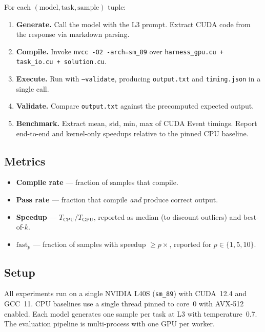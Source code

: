 \documentclass{article}
\begin{document}
For each \((\text{model}, \text{task}, \text{sample})\) tuple:
\begin{enumerate}
  \item \textbf{Generate.} Call the model with the L3 prompt. Extract
        CUDA code from the response via markdown parsing.
  \item \textbf{Compile.} Invoke \texttt{nvcc -O2 -arch=sm\_89} over
        \texttt{harness\_gpu.cu + task\_io.cu + solution.cu}.
  \item \textbf{Execute.} Run with \texttt{--validate}, producing
        \texttt{output.txt} and \texttt{timing.json} in a single call.
  \item \textbf{Validate.} Compare \texttt{output.txt} against the
        precomputed expected output.
  \item \textbf{Benchmark.} Extract mean, std, min, max of CUDA Event
        timings. Report end-to-end and kernel-only speedups relative
        to the pinned CPU baseline.
\end{enumerate}

\subsection{Metrics}

\begin{itemize}
  \item \textbf{Compile rate} --- fraction of samples that compile.
  \item \textbf{Pass rate} --- fraction that compile \emph{and}
        produce correct output.
  \item \textbf{Speedup} --- $T_{\text{CPU}} / T_{\text{GPU}}$,
        reported as median (to discount outliers) and best-of-$k$.
  \item \textbf{$\mathrm{fast}_p$} --- fraction of samples with
        speedup $\geq p\times$, reported for $p \in \{1, 5, 10\}$.
\end{itemize}

\subsection{Setup}

All experiments run on a single NVIDIA L40S (\texttt{sm\_89}) with
CUDA~12.4 and GCC~11. CPU baselines use a single thread pinned to
core~0 with AVX-512 enabled. Each model generates one sample per
task at L3 with temperature~0.7. The evaluation pipeline is
multi-process with one GPU per worker.
\end{document}
